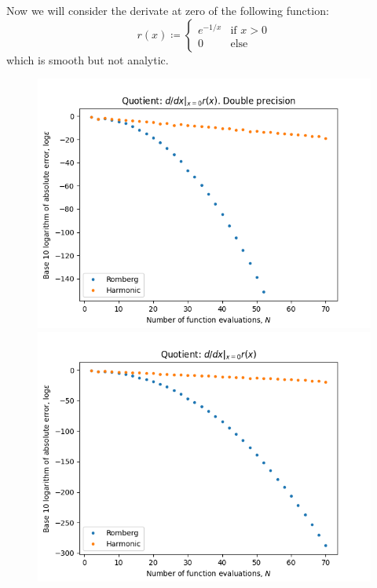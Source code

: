 Now we will consider the derivate at zero of the following function:
\[
r(x) \coloneqq \begin{cases}
e^{-1/x} & \text{if } x > 0\\
0 & \text{else}
\end{cases}
\]
which is smooth but not analytic.

\begin{figure}[H]
\centering
\begin{minipage}{0.45\textwidth}
\centering
\includegraphics[scale=0.45]{../results/diff_quot_plots/rho.png}
\end{minipage}
\begin{minipage}{0.45\textwidth}
\centering
\includegraphics[scale=0.45]{../results/diff_quot_plots/rho_hp.png}
\end{minipage}
\end{figure}

